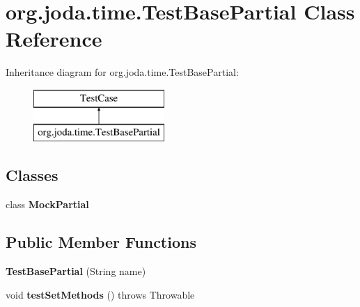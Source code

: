 \hypertarget{classorg_1_1joda_1_1time_1_1_test_base_partial}{\section{org.\-joda.\-time.\-Test\-Base\-Partial Class Reference}
\label{classorg_1_1joda_1_1time_1_1_test_base_partial}
}
Inheritance diagram for org.\-joda.\-time.\-Test\-Base\-Partial\-:\begin{figure}[H]
\begin{center}
\leavevmode
\includegraphics[height=2.000000cm]{classorg_1_1joda_1_1time_1_1_test_base_partial}
\end{center}
\end{figure}
\subsection*{Classes}
\begin{DoxyCompactItemize}
\item 
class {\bfseries Mock\-Partial}
\end{DoxyCompactItemize}
\subsection*{Public Member Functions}
\begin{DoxyCompactItemize}
\item 
\hypertarget{classorg_1_1joda_1_1time_1_1_test_base_partial_aca2d63b9ea55d9c8f3c6a4443b7096fe}{{\bfseries Test\-Base\-Partial} (String name)}\label{classorg_1_1joda_1_1time_1_1_test_base_partial_aca2d63b9ea55d9c8f3c6a4443b7096fe}

\item 
\hypertarget{classorg_1_1joda_1_1time_1_1_test_base_partial_a9006d2f1b3a5fe55e06d438ed7532ecc}{void {\bfseries test\-Set\-Methods} ()  throws Throwable }\label{classorg_1_1joda_1_1time_1_1_test_base_partial_a9006d2f1b3a5fe55e06d438ed7532ecc}

\end{DoxyCompactItemize}
